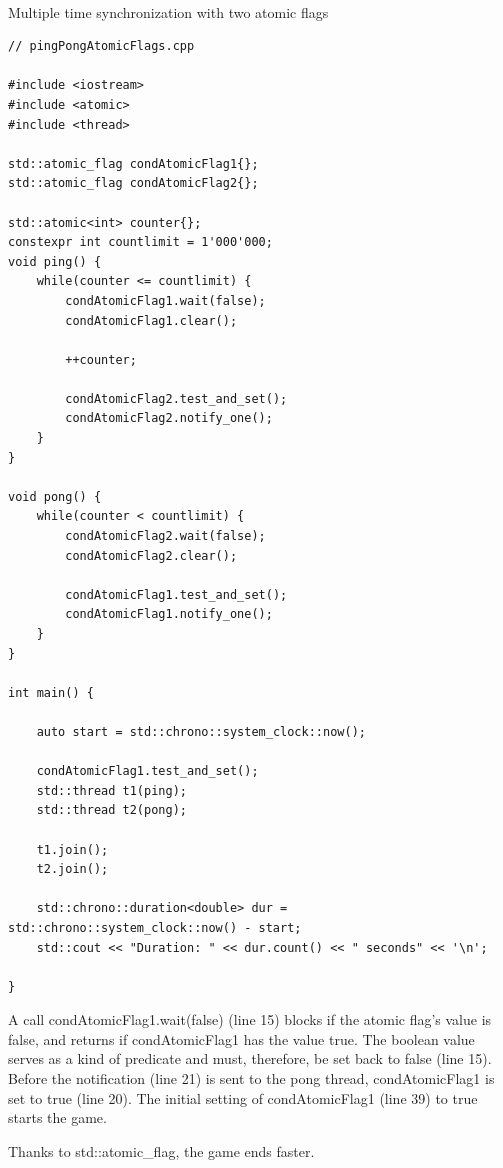 \hspace*{\fill} \\ %
\noindent
Multiple time synchronization with two atomic flags
\begin{lstlisting}[style=styleCXX]
// pingPongAtomicFlags.cpp

#include <iostream>
#include <atomic>
#include <thread>

std::atomic_flag condAtomicFlag1{};
std::atomic_flag condAtomicFlag2{};

std::atomic<int> counter{};
constexpr int countlimit = 1'000'000;
void ping() {
	while(counter <= countlimit) {
		condAtomicFlag1.wait(false);
		condAtomicFlag1.clear();
		
		++counter;
		
		condAtomicFlag2.test_and_set();
		condAtomicFlag2.notify_one();
	}
}

void pong() {
	while(counter < countlimit) {
		condAtomicFlag2.wait(false);
		condAtomicFlag2.clear();
		
		condAtomicFlag1.test_and_set();
		condAtomicFlag1.notify_one();
	}
}

int main() {

	auto start = std::chrono::system_clock::now();
	
	condAtomicFlag1.test_and_set();
	std::thread t1(ping);
	std::thread t2(pong);
	
	t1.join();
	t2.join();
	
	std::chrono::duration<double> dur = std::chrono::system_clock::now() - start;
	std::cout << "Duration: " << dur.count() << " seconds" << '\n';

}
\end{lstlisting}

A call condAtomicFlag1.wait(false) (line 15) blocks if the atomic flag’s value is false, and returns if condAtomicFlag1 has the value true. The boolean value serves as a kind of predicate and must, therefore, be set back to false (line 15). Before the notification (line 21) is sent to the pong thread, condAtomicFlag1 is set to true (line 20). The initial setting of condAtomicFlag1 (line 39) to true starts the game.

Thanks to std::atomic\_flag, the game ends faster.

